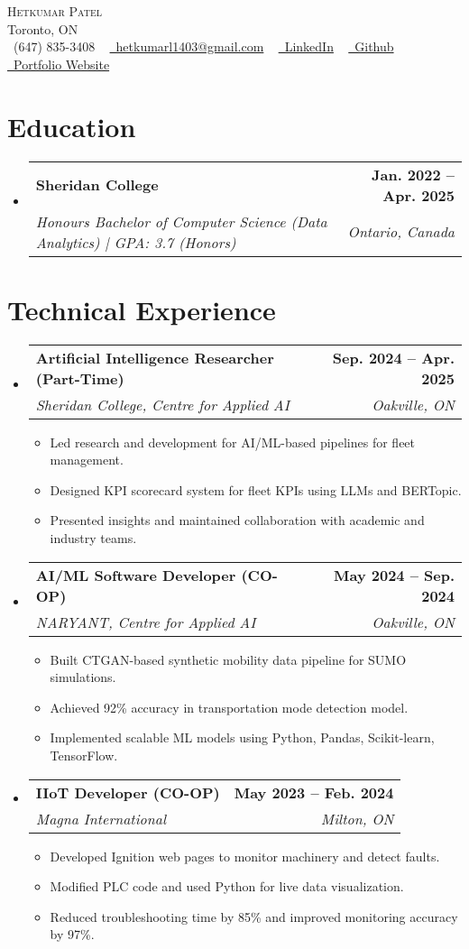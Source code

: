 \documentclass[letterpaper,11pt]{article}
\makeatletter
\newcommand{\resumeItem}[1]{\item\small{{#1 \vspace{-2pt}}}}
\newcommand{\resumeSubheading}[4]{\vspace{-2pt}\item
    \begin{tabular*}{1.0\textwidth}[t]{l@{\extracolsep{\fill}}r}
      \textbf{#1} & \textbf{\small #2} \\
      \textit{\small#3} & \textit{\small #4} \\
    \end{tabular*}\vspace{-7pt}}
\newcommand{\resumeItemListStart}{\begin{itemize}}
\newcommand{\resumeItemListEnd}{\end{itemize}\vspace{-5pt}}
\newcommand{\resumeSubHeadingListStart}{\begin{itemize}[leftmargin=0.0in, label={}]}
\newcommand{\resumeSubHeadingListEnd}{\end{itemize}}
\makeatother
\begin{document}
\begin{center}
    {\Huge \scshape Hetkumar Patel } \\ \vspace{1pt}
    Toronto, ON \\ \vspace{1pt}
    \small \faPhone\ (647) 835-3408  ~ \href{mailto:hetkumar.patel1403@gmail.com}{\faEnvelope~hetkumarl1403@gmail.com} ~ 
    \href{https://linkedin.com/in/h3t08}{\faLinkedin\ LinkedIn} ~
    \href{https://github.com/het0814}{\faGithub\ Github} ~
    \href{https://het0814.github.io/}{\faGlobe~Portfolio Website}
\end{center}

\section{Education}
  \resumeSubHeadingListStart
    \resumeSubheading
      {Sheridan College}{Jan. 2022 -- Apr. 2025}
      {Honours Bachelor of Computer Science (Data Analytics) | GPA: 3.7 (Honors)}{Ontario, Canada}
  \resumeSubHeadingListEnd

\section{Technical Experience}
  \resumeSubHeadingListStart
    \resumeSubheading
      {Artificial Intelligence Researcher (Part-Time)}{Sep. 2024 -- Apr. 2025}
      {Sheridan College, Centre for Applied AI}{Oakville, ON}
      \resumeItemListStart
        \resumeItem{Led research and development for AI/ML-based pipelines for fleet management.}
        \resumeItem{Designed KPI scorecard system for fleet KPIs using LLMs and BERTopic.}
        \resumeItem{Presented insights and maintained collaboration with academic and industry teams.}
      \resumeItemListEnd

    \resumeSubheading
      {AI/ML Software Developer (CO-OP)}{May 2024 -- Sep. 2024}
      {NARYANT, Centre for Applied AI}{Oakville, ON}
      \resumeItemListStart
        \resumeItem{Built CTGAN-based synthetic mobility data pipeline for SUMO simulations.}
        \resumeItem{Achieved 92\% accuracy in transportation mode detection model.}
        \resumeItem{Implemented scalable ML models using Python, Pandas, Scikit-learn, TensorFlow.}
      \resumeItemListEnd

    \resumeSubheading
      {IIoT Developer (CO-OP)}{May 2023 -- Feb. 2024}
      {Magna International}{Milton, ON}
      \resumeItemListStart
        \resumeItem{Developed Ignition web pages to monitor machinery and detect faults.}
        \resumeItem{Modified PLC code and used Python for live data visualization.}
        \resumeItem{Reduced troubleshooting time by 85\% and improved monitoring accuracy by 97\%.}
      \resumeItemListEnd
  \resumeSubHeadingListEnd
  
\end{document}
